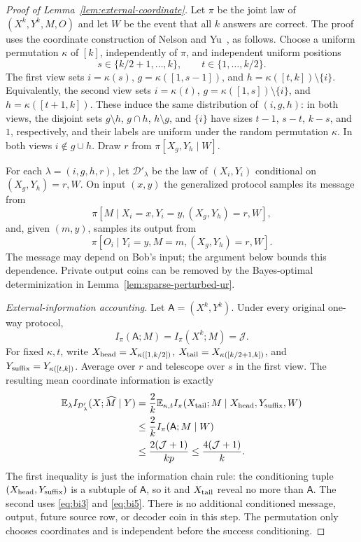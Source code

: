 \documentclass[11pt,letterpaper]{article}
\numberwithin{equation}{section}
\newcommand{\E}{\mathbb E}
\begin{document}
\begin{proof}[Proof of Lemma~\ref{lem:external-coordinate}]
Let $\pi$ be the joint law of $(X^k,Y^k,M,O)$ and let $W$ be the event that all $k$ answers are correct.
The proof uses the coordinate construction of Nelson and Yu~\cite{NelsonYu2019}, as follows.
Choose a uniform permutation $\kappa$ of $[k]$, independently of $\pi$, and independent uniform positions
\[
 s\in\{k/2+1,\ldots,k\},\qquad t\in\{1,\ldots,k/2\}.
\]
The first view sets $i=\kappa(s)$, $g=\kappa([1,s-1])$, and $h=\kappa([t,k])\setminus\{i\}$.
Equivalently, the second view sets $i=\kappa(t)$, $g=\kappa([1,s])\setminus\{i\}$, and $h=\kappa([t+1,k])$.
These induce the same distribution of $(i,g,h)$: in both views, the disjoint sets $g\setminus h$, $g\cap h$, $h\setminus g$, and $\{i\}$ have sizes $t-1$, $s-t$, $k-s$, and $1$, respectively, and their labels are uniform under the random permutation $\kappa$.
In both views $i\notin g\cup h$.
Draw $r$ from $\pi[X_g,Y_h\mid W]$.

For each $\lambda=(i,g,h,r)$, let $\mathcal D'_\lambda$ be the law of $(X_i,Y_i)$ conditional on $(X_g,Y_h)=r,W$.
On input $(x,y)$ the generalized protocol samples its message from
\[
 \pi[M\mid X_i=x,Y_i=y,(X_g,Y_h)=r,W],
\]
and, given $(m,y)$, samples its output from
\[
 \pi[O_i\mid Y_i=y,M=m,(X_g,Y_h)=r,W].
\]
The message may depend on Bob's input; the argument below bounds this dependence.
Private output coins can be removed by the Bayes-optimal determinization in Lemma~\ref{lem:sparse-perturbed-ur}.

\emph{External-information accounting.} Let $\mathsf{A}=(X^k,Y^k)$.
Under every original one-way protocol,
\begin{equation}
I_\pi(\mathsf{A};M)=I_\pi(X^k;M)=\mathcal J.
 \label{eq:bi5}
\end{equation}
For fixed $\kappa,t$, write $X_{\rm head}=X_{\kappa([1,k/2])}$, $X_{\rm tail}=X_{\kappa([k/2+1,k])}$, and $Y_{\rm suffix}=Y_{\kappa([t,k])}$.
Average over $r$ and telescope over $s$ in the first view.
The resulting mean coordinate information is exactly
\begin{equation}
\begin{aligned}
\E_\lambda I_{\mathcal D'_\lambda}(X;\widehat M\mid Y)
 &=\frac2k\E_{\kappa,t}
   I_\pi(X_{\rm tail};M\mid X_{\rm head},Y_{\rm suffix},W)\\
 &\le\frac2k I_\pi(\mathsf{A};M\mid W)\\
 &\le\frac{2(\mathcal J+1)}{kp}
 \le\frac{4(\mathcal J+1)}k.
\end{aligned}
\label{eq:bi6}
\end{equation}
The first inequality is just the information chain rule: the conditioning tuple $(X_{\rm head},Y_{\rm suffix})$ is a subtuple of $\mathsf{A}$, so it and $X_{\rm tail}$ reveal no more than $\mathsf{A}$.
The second uses \eqref{eq:bi3} and \eqref{eq:bi5}.
There is no additional conditioned message, output, future source row, or decoder coin in this step.
The permutation only chooses coordinates and is independent before the success conditioning.


\end{proof}
\end{document}
